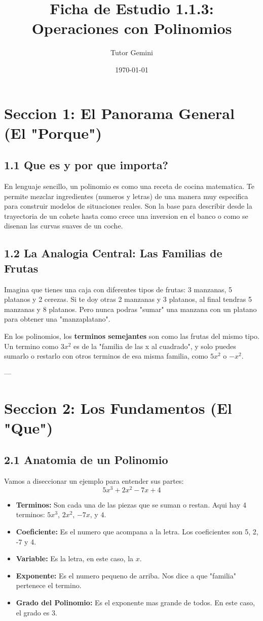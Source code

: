 \documentclass[12pt,a4paper]{article}
\title{\textbf{\Large Ficha de Estudio 1.1.3: Operaciones con Polinomios}}
\author{Tutor Gemini}
\date{\today}
\begin{document}
\maketitle

\section*{Seccion 1: El Panorama General (El "Porque")}

\subsection*{1.1 Que es y por que importa?}
En lenguaje sencillo, un polinomio es como una receta de cocina matematica. Te permite mezclar ingredientes (numeros y letras) de una manera muy especifica para construir modelos de situaciones reales. Son la base para describir desde la trayectoria de un cohete hasta como crece una inversion en el banco o como se disenan las curvas suaves de un coche.

\subsection*{1.2 La Analogia Central: Las Familias de Frutas}
Imagina que tienes una caja con diferentes tipos de frutas: 3 manzanas, 5 platanos y 2 cerezas. Si te doy otras 2 manzanas y 3 platanos, al final tendras 5 manzanas y 8 platanos. Pero nunca podras "sumar" una manzana con un platano para obtener una "manzaplatano".

En los polinomios, los \textbf{terminos semejantes} son como las frutas del mismo tipo. Un termino como $3x^2$ es de la "familia de las x al cuadrado", y solo puedes sumarlo o restarlo con otros terminos de esa misma familia, como $5x^2$ o $-x^2$.

---

\section*{Seccion 2: Los Fundamentos (El "Que")}

\subsection*{2.1 Anatomia de un Polinomio}
Vamos a diseccionar un ejemplo para entender sus partes:
$$ 5x^3 + 2x^2 - 7x + 4 $$
\begin{itemize}
    \item \textbf{Terminos:} Son cada una de las piezas que se suman o restan. Aqui hay 4 terminos: $5x^3$, $2x^2$, $-7x$, y $4$.
    \item \textbf{Coeficiente:} Es el numero que acompana a la letra. Los coeficientes son 5, 2, -7 y 4.
    \item \textbf{Variable:} Es la letra, en este caso, la $x$.
    \item \textbf{Exponente:} Es el numero pequeno de arriba. Nos dice a que "familia" pertenece el termino.
    \item \textbf{Grado del Polinomio:} Es el exponente mas grande de todos. En este caso, el grado es 3.
\end{itemize}
\end{document}
